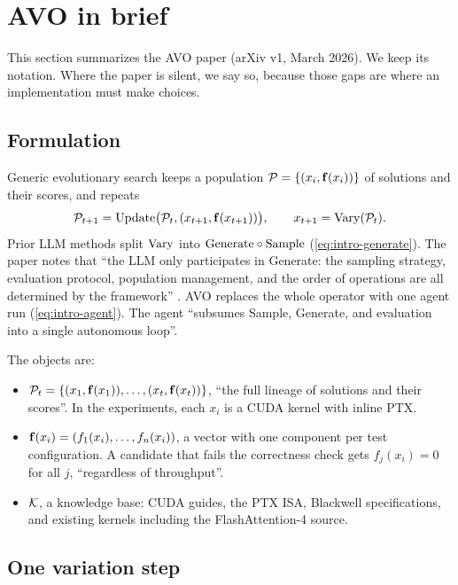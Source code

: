 \section{AVO in brief}
\label{sec:avo}

This section summarizes the AVO paper \citep{chen2026avo} (arXiv v1, March 2026). We keep its
notation. Where the paper is silent, we say so, because those gaps are where an implementation must
make choices.

\subsection{Formulation}

Generic evolutionary search keeps a population $\mathcal{P} = \{(x_i, \mathbf{f}(x_i))\}$ of solutions and their
scores, and repeats
\begin{equation}
  \mathcal{P}_{t+1} = \mathrm{Update}\big(\mathcal{P}_t, (x_{t+1}, \mathbf{f}(x_{t+1}))\big), \qquad x_{t+1} = \mathrm{Vary}(\mathcal{P}_t).
  \label{eq:evo}
\end{equation}
Prior LLM methods split $\mathrm{Vary}$ into $\mathrm{Generate} \circ \mathrm{Sample}$ (\cref{eq:intro-generate}). The paper
notes that ``the LLM only participates in Generate: the sampling strategy, evaluation protocol,
population management, and the order of operations are all determined by the framework''
\citep[\S2.1]{chen2026avo}. AVO replaces the whole operator with one agent run
(\cref{eq:intro-agent}). The agent ``subsumes Sample, Generate, and evaluation into a single
autonomous loop''.

The objects are:
\begin{itemize}[leftmargin=*,itemsep=1pt]
  \item $\mathcal{P}_t = \{(x_1, \mathbf{f}(x_1)), \ldots, (x_t, \mathbf{f}(x_t))\}$, ``the full lineage of solutions and their
    scores''. In the experiments, each $x_i$ is a CUDA kernel with inline PTX.
  \item $\mathbf{f}(x_i) = (f_1(x_i), \ldots, f_n(x_i))$, a vector with one component per test
    configuration. A candidate that fails the correctness check gets $f_j(x_i) = 0$ for all $j$,
    ``regardless of throughput''.
  \item $\mathcal{K}$, a knowledge base: CUDA guides, the PTX ISA, Blackwell specifications, and existing
    kernels including the FlashAttention-4 source.
\end{itemize}

\subsection{One variation step}

